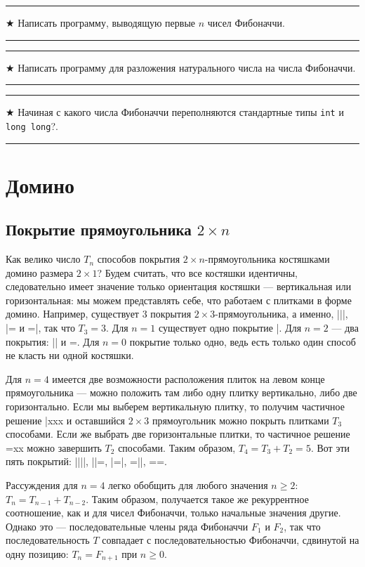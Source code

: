 \documentclass[14pt]{book}
\newenvironment{task}
 { \vspace{2ex}\hrule\vspace{2ex}$\bigstar$ }
 { \vspace{2ex}\hrule\vspace{2ex} }
\begin{document}
\begin{task}
Написать программу, выводящую первые $n$ чисел Фибоначчи.
\end{task}

\begin{task}
Написать программу для разложения натурального числа на числа Фибоначчи.
\end{task}

\begin{task}
Начиная с какого числа Фибоначчи переполняются стандартные типы \texttt{int} и \texttt{long long}?.
\end{task}

\section{Домино}

\subsection{Покрытие прямоугольника $2\times n$}

Как велико число $T_n$ способов покрытия $2\times n$-прямоугольника костяшками домино размера
$2\times 1$? Будем считать, что все костяшки идентичны, следовательно имеет значение только
ориентация костяшки --- вертикальная или горизонтальная: мы можем представлять себе, что
работаем с плитками в форме домино. Например, существует $3$ покрытия $2\times 3$-прямоугольника,
а именно, |||, |= и =|, так что $T_3 = 3$. Для $n=1$ существует одно покрытие |. Для $n=2$
--- два покрытия: || и =. Для $n=0$ покрытие только одно, ведь есть только один
способ не класть ни одной костяшки.

Для $n=4$ имеется две возможности расположения плиток на левом конце прямоугольника
--- можно положить там либо одну плитку вертикально, либо две горизонтально. Если мы выберем
вертикальную плитку, то получим частичное решение |xxx и оставшийся $2\times 3$ прямоугольник
можно покрыть плитками $T_3$ способами. Если же выбрать две горизонтальные плитки, то
частичное решение =xx можно завершить $T_2$ способами. Таким образом, $T_4=T_3+T_2=5$.
Вот эти пять покрытий: ||||, ||=, |=|, =||, ==.

Рассуждения для $n=4$ легко обобщить для любого значения $n \ge 2$: $T_n = T_{n-1} + T_{n-2}$.
Таким образом, получается такое же рекуррентное соотношение, как и для чисел Фибоначчи,
только начальные значения другие. Однако это --- последовательные члены ряда Фибоначчи
$F_1$ и $F_2$, так что последовательность $T$ совпадает с последовательностью Фибоначчи,
сдвинутой на одну позицию: $T_n = F_{n+1} \text{ при $n \ge 0$}$.
\end{document}

